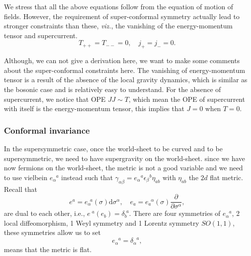 \documentclass[graybox,envcountchap,sectrefs]{svmono}
\begin{document}
We stress that all the above equations follow from the equation of motion of fields. However, the requirement of super-conformal symmetry actually lead to stronger constraints than these, \emph{viz.}, the vanishing of the energy-momentum tensor and supercurrent.
\begin{equation}
T_{++}=T_{--}=0,\quad j_{+}=j_{-}=0.	
\end{equation}

Although, we can not give a derivation here, we want to make some comments about the super-conformal constraints here.
The vanishing of energy-momentum tensor is a result of the absence of the local gravity dynamics, which is similar as the bosonic case and is relatively easy to understand. For the absence of supercurrent, we notice that OPE $JJ\sim T$, which mean the OPE of supercurrent with itself is the energy-momentum tensor, this implies that $J=0$ when $T=0$.

\subsubsection*{Conformal invariance}
In the supersymmetric case, once the world-sheet to be curved and to be supersymmetric, we need to have supergravity on the world-sheet. since we have now fermions on the world-sheet, the metric is not a good variable and we need to use vielbein $e_{\alpha}^{\,\,\,\,a}$ instead such that 
$\gamma_{\alpha \beta}=e_{\alpha}{ }^{a} \epsilon_{\beta}{ }^{b} \eta_{a b}$ with $\eta_{a b}$ the $2d$ flat metric.
Recall that
\begin{equation}
e^a=e_{\alpha}^{\,\,\, a}(\sigma)\mathrm{d}\sigma^{\alpha}, \quad e_a=e_a^{\,\,\, \alpha}(\sigma)\frac{\partial}{\partial \sigma^{\alpha}},
\end{equation}
are dual to each other, i.e., $e^{\,\,a}(e_b)=\delta^{\,\, a}_{b}$.
There are four symmetries of  $e_{\alpha}^{\,\,\,\,a}$, 2 local diffeomorphism, 1 Weyl symmetry and 1 Lorentz symmetry $SO(1,1)$, these symmetries allow us to set 
\begin{equation}
	e_{\alpha}^{\,\,\,\,a}=\delta_{\alpha}^{\,\,\,\,a},
\end{equation}
means that the metric is flat.
\end{document}
